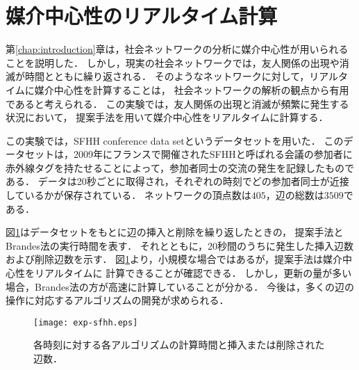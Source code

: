 \section{媒介中心性のリアルタイム計算}

第\ref{chap:introduction}章は，社会ネットワークの分析に媒介中心性が用いられることを説明した．
しかし，現実の社会ネットワークでは，友人関係の出現や消滅が時間とともに繰り返される．
そのようなネットワークに対して，リアルタイムに媒介中心性を計算することは，
社会ネットワークの解析の観点から有用であると考えられる．
この実験では，友人関係の出現と消滅が頻繁に発生する状況において，
提案手法を用いて媒介中心性をリアルタイムに計算する．

この実験では，SFHH conference data set\cite{Genois2018}というデータセットを用いた．
このデータセットは，2009年にフランスで開催されたSFHHと呼ばれる会議の参加者に
赤外線タグを持たせることによって，参加者同士の交流の発生を記録したものである．
データは20秒ごとに取得され，それぞれの時刻でどの参加者同士が近接しているかが保存されている．
ネットワークの頂点数は$405$，辺の総数は$3509$である．

図\ref{fig:exp-sfhh}はデータセットをもとに辺の挿入と削除を繰り返したときの，
提案手法とBrandes法の実行時間を表す．
それとともに，20秒間のうちに発生した挿入辺数および削除辺数を示す．
図\ref{fig:exp-sfhh}より，小規模な場合ではあるが，提案手法は媒介中心性をリアルタイムに
計算できることが確認できる．
しかし，更新の量が多い場合，Brandes法の方が高速に計算していることが分かる．
今後は，多くの辺の操作に対応するアルゴリズムの開発が求められる．

\begin{figure}[tb]
  \centering
  \texttt{[image: exp-sfhh.eps]}
  \caption{各時刻に対する各アルゴリズムの計算時間と挿入または削除された辺数．}
  \label{fig:exp-sfhh}
\end{figure}
